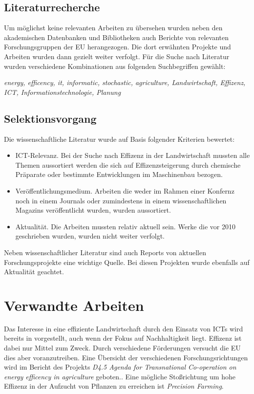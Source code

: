 \subsection{Literaturrecherche}
Um möglichst keine relevanten Arbeiten zu übersehen wurden neben den akademischen Datenbanken und Bibliotheken auch Berichte von relevanten Forschungsgruppen der EU herangezogen. Die dort erwähnten Projekte und Arbeiten wurden dann gezielt weiter verfolgt. Für die Suche nach Literatur wurden verschiedene Kombinationen aus folgenden Suchbegriffen gewählt:

\textit{energy, efficency, it, informatic, stochastic, agriculture, Landwirtschaft, Effizenz, ICT, Informationstechnologie, Planung}

\subsection{Selektionsvorgang}
Die wissenschaftliche Literatur wurde auf Basis folgender Kriterien bewertet:
\begin{itemize}
  \item ICT-Relevanz. Bei der Suche nach Effizenz in der Landwirtschaft mussten alle Themen aussortiert werden die sich auf Effizenzsteigerung durch chemische Präparate oder bestimmte Entwicklungen im Maschinenbau bezogen.
  \item Veröffentlichungsmedium. Arbeiten die weder im Rahmen einer Konfernz noch in einem Journals oder zumindestens in einem wissenschaftlichen Magazins veröffentlicht wurden, wurden aussortiert.
  \item Aktualität. Die Arbeiten mussten relativ aktuell sein. Werke die vor 2010 geschrieben wurden, wurden nicht weiter verfolgt.
\end{itemize}

Neben wissenschaftlicher Literatur sind auch Reports von aktuellen Forschungsprojekte eine wichtige Quelle. Bei diesen Projekten wurde ebenfalls auf Aktualität geachtet.

\section{Verwandte Arbeiten}
Das Interesse in eine effiziente Landwirtschaft durch den Einsatz von ICTs wird bereits in \cite{jour:Andreopoulou2012} vorgestellt, auch wenn der Fokus auf Nachhaltigkeit liegt. Effizenz ist dabei nur Mittel zum Zweck. Durch verschiedene Förderungen versucht die EU dies aber voranzutreiben. Eine Übersicht der verschiedenen Forschungsrichtungen wird im Bericht des Projekts \textit{D4.5 Agenda for Transnational Co-operation on energy efficency in agriculture} geboten.\cite{misc:Mikkola2013}. Eine mögliche Stoßrichtung um hohe Effizenz in der Aufzucht von Pflanzen zu erreichen ist \textit{Precision Farming}\cite{jour:Auernhammer2001}.

